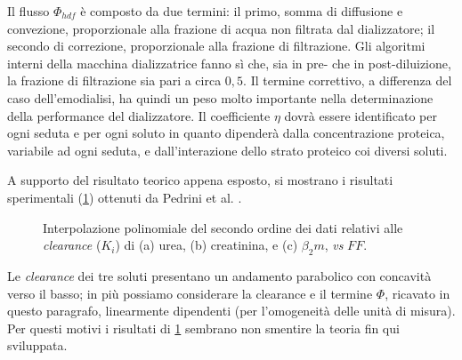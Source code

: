 Il flusso $\Phi_{hdf}$ è composto da due termini: il primo, somma di diffusione e convezione, proporzionale alla frazione di acqua non filtrata dal dializzatore; il secondo di correzione, proporzionale alla frazione di filtrazione.
Gli algoritmi interni della macchina dializzatrice fanno sì che, sia in pre- che in post-diluizione, la frazione di filtrazione sia pari a circa $0,5$. Il termine correttivo, a differenza del caso dell'emodialisi, ha quindi un peso molto importante nella determinazione della performance del dializzatore. Il coefficiente $\eta$ dovrà essere identificato per ogni seduta e per ogni soluto in quanto dipenderà dalla concentrazione proteica, variabile ad ogni seduta, e dall'interazione dello strato proteico coi diversi soluti.

A supporto del risultato teorico appena esposto, si mostrano i risultati sperimentali (\figurename\ref{pedr2}) ottenuti da Pedrini et al. \cite{pedrini2}.
\begin{figure}[htb]
	\centering
	\quad
	\quad
		\caption{Interpolazione polinomiale del secondo ordine dei dati relativi alle \textit{clearance} ($K_i$) di (a) urea, (b) creatinina, e (c) $\beta_2m$, \textit{vs} $FF$.}\label{pedr2}
\end{figure}
Le \textit{clearance} dei tre soluti presentano un andamento parabolico con concavità verso il basso; in più possiamo considerare la clearance e il termine $\Phi$, ricavato in questo paragrafo, linearmente dipendenti (per l'omogeneità delle unità di misura). Per questi motivi i risultati di \figurename\ref{pedr2} sembrano non smentire la teoria fin qui sviluppata.
